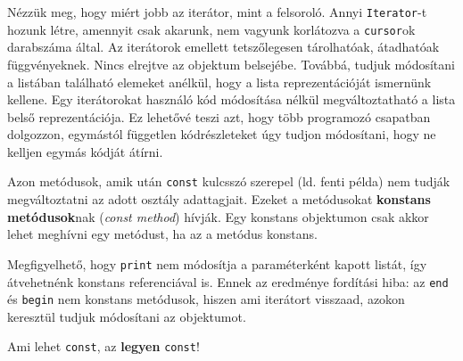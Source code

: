 \documentclass[a4paper,11.5pt,table]{article}
\begin{document}
	\medskip
	Nézzük meg, hogy miért jobb az iterátor, mint a felsoroló. Annyi \texttt{Iterator}-t hozunk létre, amennyit csak akarunk, nem vagyunk korlátozva a \texttt{cursor}ok darabszáma által. Az iterátorok emellett tetszőlegesen tárolhatóak, átadhatóak függvényeknek. Nincs elrejtve az objektum belsejébe. Továbbá, tudjuk módosítani a listában található elemeket anélkül, hogy a lista reprezentációját ismernünk kellene. Egy iterátorokat használó kód módosítása nélkül megváltoztatható a lista belső reprezentációja. Ez lehetővé teszi azt, hogy több programozó csapatban dolgozzon, egymástól független kódrészleteket úgy tudjon módosítani, hogy ne kelljen egymás kódját átírni.
	
	\medskip
	Azon metódusok, amik után \texttt{const} kulcsszó szerepel (ld. fenti példa) nem tudják megváltoztatni az adott osztály adattagjait. Ezeket a metódusokat \textbf{konstans metódusok}nak (\textit{const method}) hívják. Egy konstans objektumon csak akkor lehet meghívni egy metódust, ha az a metódus konstans.
	
	\medskip
	Megfigyelhető, hogy \texttt{print} nem módosítja a paraméterként kapott listát, így átvehetnénk konstans referenciával is. Ennek az eredménye fordítási hiba: az \texttt{end} és \texttt{begin} nem konstans metódusok, hiszen ami iterátort visszaad, azokon keresztül tudjuk módosítani az objektumot.
	\begin{note}
		Ami lehet \texttt{const}, az \textbf{legyen} \texttt{const}!
	\end{note}
\end{document}
